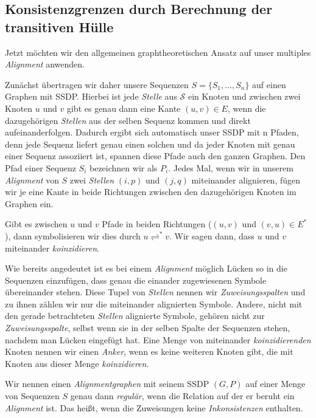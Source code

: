 \subsection{Konsistenzgrenzen durch Berechnung der transitiven Hülle}

Jetzt möchten wir den allgemeinen graphtheoretischen Ansatz auf unser multiples \emph{Alignment} anwenden. 
	
\begin{definition}[Alignmentgraph]
	Zunächst übertragen wir daher unsere Sequenzen $S = \{S_1, \dots, S_n\}$ auf einen Graphen mit SSDP. Hierbei ist jede \emph{Stelle} aus $\mathcal{S}$ ein Knoten und zwischen zwei Knoten $u$ und $v$ gibt es genau dann eine Kante $(u,v) \in E$, wenn die dazugehörigen \emph{Stellen} aus der selben Sequenz kommen und direkt aufeinanderfolgen. Dadurch ergibt sich automatisch unser SSDP mit n Pfaden, denn jede Sequenz liefert genau einen solchen und da jeder Knoten mit genau einer Sequenz assoziiert ist, spannen diese Pfade auch den ganzen Graphen. Den Pfad einer Sequenz $S_i$ bezeichnen wir als $P_i$.
	Jedes Mal, wenn wir in unserem \emph{Alignment} von $S$ zwei \emph{Stellen} $(i,p)$ und $(j,q)$ miteinander alignieren, fügen wir je eine Kante in beide Richtungen zwischen den dazugehörigen Knoten im Graphen ein.
\end{definition}

Gibt es zwischen $u$ und $v$ Pfade in beiden Richtungen ($(u,v)$ und $(v,u) \in E^*$), dann symbolisieren wir dies durch $u \rightleftharpoons^{*} v$. Wir sagen dann, dass $u$ und $v$ miteinander \emph{koinzidieren}. 

Wie bereits angedeutet ist es bei einem \emph{Alignment} möglich Lücken so in die Sequenzen einzufügen, dass genau die einander zugewiesenen Symbole übereinander stehen. Diese Tupel von \emph{Stellen} nennen wir \emph{Zuweisungsspalten} und zu ihnen zählen wir nur die miteinander alignierten Symbole. Andere, nicht mit den gerade betrachteten \emph{Stellen} alignierte Symbole, gehören nicht zur \emph{Zuweisungsspalte}, selbst wenn sie in der selben Spalte der Sequenzen stehen, nachdem man Lücken eingefügt hat. Eine Menge von miteinander \emph{koinzidierenden} Knoten nennen wir einen \emph{Anker}, wenn es keine weiteren Knoten gibt, die mit Knoten aus dieser Menge \emph{koinzidieren}.

Wir nennen einen \emph{Alignmentgraphen} mit seinem SSDP $(G,P)$ auf einer Menge von Sequenzen $S$ genau dann \emph{regulär}, wenn die Relation auf der er beruht ein \emph{Alignment} ist. Das heißt, wenn die Zuweisungen keine \emph{Inkonsistenzen} enthalten.

